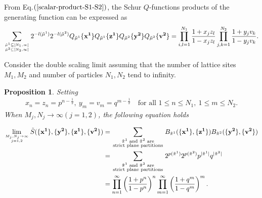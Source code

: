\documentclass[11pt,reqno]{amsart}
\numberwithin{equation}{section}
\newtheorem{proposition}[theorem]{Proposition}
\begin{document}
From Eq.$(\ref{scalar-product-S1-S2})$, the Schur $Q$-functions products  of the generating function can be expressed as
	\begin{align}
		\sum_{{ \tilde{\mu}^{1} \subseteq [N_1,\infty]}\atop{\tilde{\mu}^{2} \subseteq [N_2,\infty]}}
		2^{- l(\tilde{\mu}^{1})}	2^{- l(\tilde{\mu}^{2})}	
		Q_{\tilde{\mu}^{1}}\{\mathbf{x^1}\}  Q_{\tilde{\mu}^{1}}\{\mathbf{z^1}\}
		Q_{\tilde{\mu}^{2}}\{\mathbf{y^2}\}  Q_{\tilde{\mu}^{2}}\{\mathbf{v^2}\} 	
		=\prod_{i,l=1}^{N_1} \frac{1 +  x_{j}z_{l}}{1 -  x_{j}z_{l}} \prod_{j,k=1}^{N_2} \frac{1 + y_{j} v_{k}}{1 - y_{j} v_{k}}.
	\end{align}
	
	Consider the double scaling limit assuming that the number of lattice sites $M_{1},M_{2}$ and number of particles $N_{1},N_{2}$ tend to infinity.
	\begin{proposition}
		Setting
		\begin{align}\label{set-z}
			x_{n}=z_{n}=p^{n-\frac{1}{2}}, ~ y_{m}=v_{m}=q^{m-\frac{1}{2}}
			\quad \text{for all } 1 \leq n \leq N_1, ~ 1 \leq m \leq N_2.
		\end{align}
		When $M_{j},N_{j} \to \infty(j=1,2)$, the following equation holds
		
		\begin{align}
			\lim\limits_{{M_{j},N_{j}\to \infty} \atop{j=1,2}	}
			\tilde{S}(\{\mathbf{x^1}\}, \{\mathbf{y^2}\}, \{\mathbf{z^1}\}, \{\mathbf{v^2}\})
			&=
			\sum_{\begin{smallmatrix}\tilde{\pi}^{1}\text{ and }\tilde{\pi}^{2}\text{ are}\\\text{strict plane partitions}\end{smallmatrix}}
			B_{\tilde{\pi}^{1} }(\{\mathbf{x^1}\}, \{\mathbf{z^1}\}) B_{\tilde{\pi}^{2} }(\{\mathbf{y^2}\}, \{\mathbf{v^2}\})\notag\\
			&=	\sum_{\begin{smallmatrix}\tilde{\pi}^{1}\text{ and }\tilde{\pi}^{2}\text{ are}\\\text{strict plane partitions}\end{smallmatrix}}
			2^{p{(\tilde{\pi}^{1})}}2^{p{(\tilde{\pi}^{2})}}
			p^{|\tilde{\pi}^{1}|}q^{|\tilde{\pi}^{2}|}\notag\\
			&=\prod_{n=1}^\infty\left(\frac{1+p^n}{1-p^n}\right)^n
			\prod_{m=1}^\infty\left(\frac{1+q^m}{1-q^m}\right)^m.
		\end{align}
	\end{proposition}
	
\end{document}
